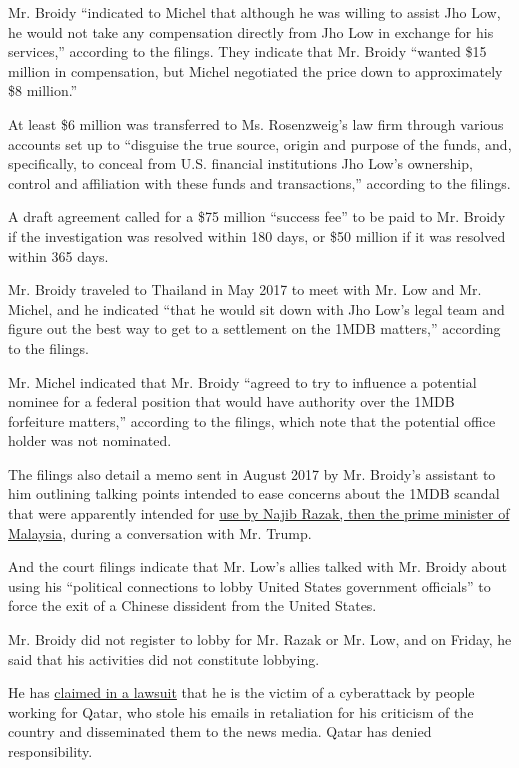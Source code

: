 Mr. Broidy ``indicated to Michel that although he was willing to assist
Jho Low, he would not take any compensation directly from Jho Low in
exchange for his services,'' according to the filings. They indicate
that Mr. Broidy ``wanted \$15 million in compensation, but Michel
negotiated the price down to approximately \$8 million.''

At least \$6 million was transferred to Ms. Rosenzweig's law firm
through various accounts set up to ``disguise the true source, origin
and purpose of the funds, and, specifically, to conceal from U.S.
financial institutions Jho Low's ownership, control and affiliation with
these funds and transactions,'' according to the filings.

A draft agreement called for a \$75 million ``success fee'' to be paid
to Mr. Broidy if the investigation was resolved within 180 days, or \$50
million if it was resolved within 365 days.

Mr. Broidy traveled to Thailand in May 2017 to meet with Mr. Low and Mr.
Michel, and he indicated ``that he would sit down with Jho Low's legal
team and figure out the best way to get to a settlement on the 1MDB
matters,'' according to the filings.

Mr. Michel indicated that Mr. Broidy ``agreed to try to influence a
potential nominee for a federal position that would have authority over
the 1MDB forfeiture matters,'' according to the filings, which note that
the potential office holder was not nominated.

The filings also detail a memo sent in August 2017 by Mr. Broidy's
assistant to him outlining talking points intended to ease concerns
about the 1MDB scandal that were apparently intended for
\href{https://www.nytimes.com/2018/04/19/world/asia/elliott-broidy-trump-malaysia-china-guo.html}{use
by Najib Razak, then the prime minister of Malaysia}, during a
conversation with Mr. Trump.

And the court filings indicate that Mr. Low's allies talked with Mr.
Broidy about using his ``political connections to lobby United States
government officials'' to force the exit of a Chinese dissident from the
United States.

Mr. Broidy did not register to lobby for Mr. Razak or Mr. Low, and on
Friday, he said that his activities did not constitute lobbying.

He has
\href{https://www.nytimes.com/2018/09/20/world/middleeast/broidy-trump-hackers-qatar.html}{claimed
in a lawsuit} that he is the victim of a cyberattack by people working
for Qatar, who stole his emails in retaliation for his criticism of the
country and disseminated them to the news media. Qatar has denied
responsibility.

